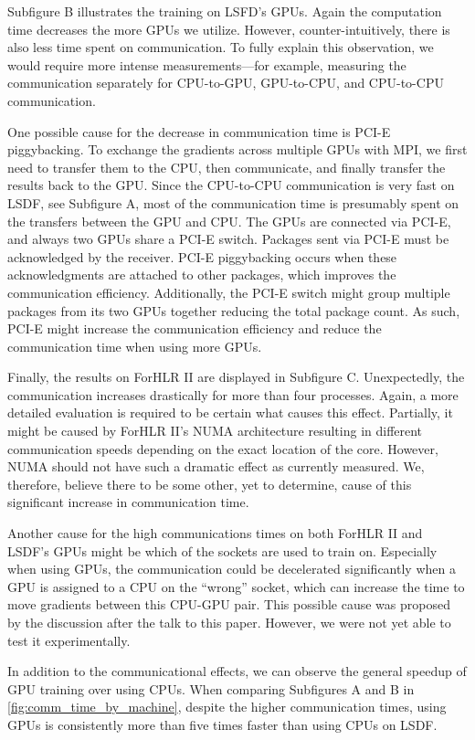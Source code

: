 \documentclass[conference]{IEEEtran}
\begin{document}
Subfigure B illustrates the training on LSFD's GPUs.
Again the computation time decreases the more GPUs we utilize.
However, counter-intuitively, there is also less time spent on communication.
%
To fully explain this observation, we would require more intense measurements---for example, measuring the communication separately for CPU-to-GPU, GPU-to-CPU, and CPU-to-CPU communication.

One possible cause for the decrease in communication time is PCI-E piggybacking.
To exchange the gradients across multiple GPUs with MPI, we first need to transfer them to the CPU, then communicate, and finally transfer the results back to the GPU.
Since the CPU-to-CPU communication is very fast on LSDF, see Subfigure A, most of the communication time is presumably spent on the transfers between the GPU and CPU.
%
The GPUs are connected via PCI-E, and always two GPUs share a PCI-E switch.
Packages sent via PCI-E must be acknowledged by the receiver.
PCI-E piggybacking occurs when these acknowledgments are attached to other packages, which improves the communication efficiency.
Additionally, the PCI-E switch might group multiple packages from its two GPUs together reducing the total package count.
As such, PCI-E might increase the communication efficiency and reduce the communication time when using more GPUs.

Finally, the results on ForHLR II are displayed in Subfigure C.
Unexpectedly, the communication increases drastically for more than four processes.
Again, a more detailed evaluation is required to be certain what causes this effect.
Partially, it might be caused by ForHLR II's NUMA architecture resulting in different communication speeds depending on the exact location of the core.
However, NUMA should not have such a dramatic effect as currently measured.
We, therefore, believe there to be some other, yet to determine, cause of this significant increase in communication time.

Another cause for the high communications times on both ForHLR II and LSDF's GPUs might be which of the sockets are used to train on.
Especially when using GPUs, the communication could be decelerated significantly when a GPU is assigned to a CPU on the ``wrong'' socket, which can increase the time to move gradients between this CPU-GPU pair.
This possible cause was proposed by the discussion after the talk to this paper.
However, we were not yet able to test it experimentally.

In addition to the communicational effects, we can observe the general speedup of GPU training over using CPUs.
When comparing Subfigures A and B in \autoref{fig:comm_time_by_machine}, despite the higher communication times, using GPUs is consistently more than five times faster than using CPUs on LSDF.
\end{document}
